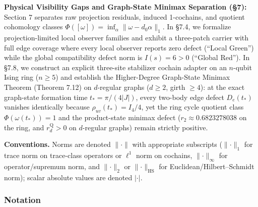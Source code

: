 \documentclass[
  11pt,
]{article}
\begin{document}
\begin{enumerate}
  \textbf{Physical Visibility Gaps and Graph-State Minimax Separation (§7):} Section 7 separates raw projection residuals, induced 1-cochains, and quotient cohomology classes \(\Phi([\omega])=\inf_\alpha\lVert\omega-d_0\alpha\rVert_1\). In §7.4, we formalize projection-limited local observer families and exhibit a three-patch carrier with full edge coverage where every local observer reports zero defect (``Local Green'') while the global compatibility defect norm is \(I(s)=6>0\) (``Global Red''). In §7.8, we construct an explicit three-site stabilizer cochain adapter on an \(n\)-qubit Ising ring (\(n\ge 5\)) and establish the Higher-Degree Graph-State Minimax Theorem (Theorem 7.12) on \(d\)-regular graphs (\(d \ge 2\), girth \(\ge 4\)): at the exact graph-state formation time \(t_*=\pi/(4|J|)\), every two-body edge defect \(D_e(t_*)\) vanishes identically because \(\rho_{uv}(t_*)=I_4/4\), yet the ring cycle quotient class \(\Phi(\omega(t_*))=1\) and the product-state minimax defect (\(r_2\approx0.6823278038\) on the ring, and \(r_d^{\mathrm{Q}} > 0\) on \(d\)-regular graphs) remain strictly positive.
\end{enumerate}

\textbf{Conventions.} Norms are denoted \(\lVert \cdot \rVert\) with appropriate subscripts (\(\lVert\cdot\rVert_1\) for trace norm on trace-class operators or \(\ell^1\) norm on cochains, \(\lVert\cdot\rVert_\infty\) for operator/supremum norm, and \(\lVert\cdot\rVert_2\) or \(\lVert\cdot\rVert_{\mathrm{HS}}\) for Euclidean/Hilbert--Schmidt norm); scalar absolute values are denoted \(|\cdot|\).

\subsubsection{Notation}\label{notation}
\end{document}
